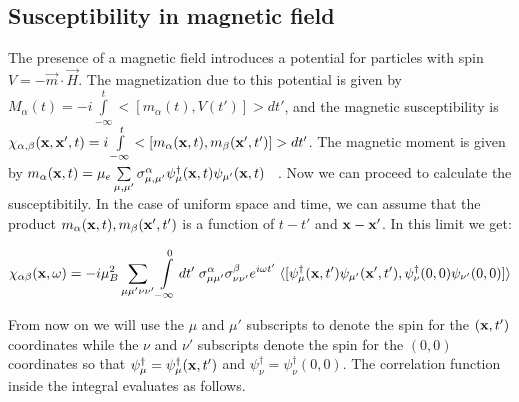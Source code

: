 \documentclass[prb,showpacs,amssymb,amsmath,twocolumn]{revtex4-1}
\begin{document}
\appendix
\begin{widetext}


\section{\label{sec:appA} Susceptibility in magnetic field} 

The presence of a magnetic field introduces a potential for particles with spin $V=-\vec{m}\cdot\vec{H}$. The magnetization due to this potential is given by $M_\alpha(t)=-i\int\limits_{-\infty}^t <[m_\alpha(t),V(t')]>dt'$, and the magnetic susceptibility is $\chi_{\alpha,\beta}({\bf x},{\bf x}',t)=i\int\limits_{-\infty}^t<[m_\alpha({\bf x},t),m_\beta({\bf x}',t')]>dt'$. The magnetic moment is given by $m_\alpha({\bf x},t)=\mu_e\sum\limits_{\mu,\mu'} \sigma^{\alpha}_{\mu,\mu'}\psi^\dagger_\mu({\bf x},t) \psi_{\mu'}({\bf x},t)$ ~\cite{mahan}. Now we can proceed to calculate the susceptibitily. In the case of uniform space and time, we can assume that the product $m_\alpha({\bf x},t),m_\beta({\bf x}',t')$ is a function of $t-t'$ and ${\bf x}-{\bf x}'$. In this limit we get:

\begin{align*}
\chi_{\alpha\beta}({\bf x}, \omega)=-i \mu_B^2\sum\limits_{\mu\mu'\nu\nu'}\int\limits_{-\infty}^{0}dt' \; \sigma^\alpha_{\mu\mu'}\sigma^\beta_{\nu\nu'}e^{i\omega t'} \; 
\langle [\psi^\dagger_\mu({\bf x} ,t') \psi_{\mu'}({\bf x}',t'),  \psi^\dagger_\nu(0,0) \psi_{\nu'}(0,0) ]\rangle
\end{align*}

From now on we will use the $\mu$ and $\mu'$ subscripts to denote the spin for the $({\bf x},t')$ coordinates while the $\nu$ and $\nu'$ subscripts denote the spin for the $(0,0)$ coordinates so that $\psi^\dagger_{\mu}=\psi^\dagger_{\mu}({\bf x},t')$ and $\psi^\dagger_{\nu}=\psi^\dagger_{\nu}(0,0)$. The correlation function inside the integral evaluates as follows.


\end{widetext}
\end{document}
